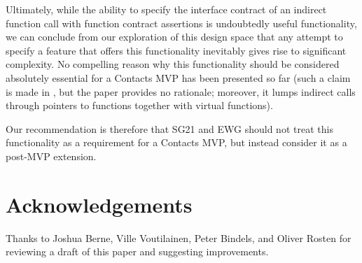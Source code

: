 Ultimately, while the ability to specify the interface contract of an indirect function call with function contract assertions is undoubtedly useful functionality, we can conclude from our exploration of this design space that any attempt to specify a feature that offers this functionality inevitably gives rise to significant complexity. No compelling reason why this functionality should be considered absolutely essential for a Contacts MVP has been presented so far (such a claim is  made in \cite{P3173R0}, but the paper provides no rationale; moreover, it lumps indirect calls through pointers to functions together with virtual functions).

Our recommendation is therefore that SG21 and EWG should not treat this functionality as a requirement for a Contacts MVP, but instead consider it as a post-MVP extension.



\section*{Acknowledgements}
Thanks to Joshua Berne, Ville Voutilainen, Peter Bindels, and Oliver Rosten for reviewing a draft of this paper and suggesting improvements.




\renewcommand{\addcontentsline}[3]{}%







